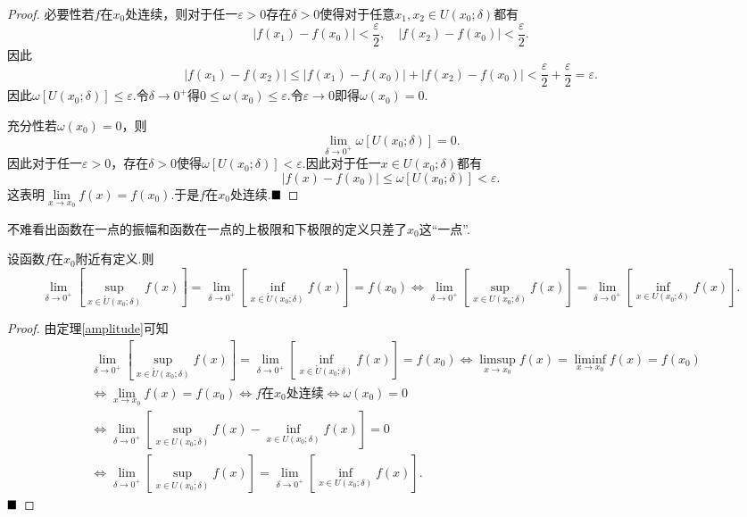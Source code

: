 \begin{proof}
	必要性\qquad 若$f$在$x_0$处连续，则对于任一$\varepsilon>0$存在$\delta>0$使得对于任意$x_1,x_2\in U(x_0;\delta)$都有
	$$|f(x_1)-f(x_0)|<\frac{\varepsilon}{2},\quad |f(x_2)-f(x_0)|<\frac{\varepsilon}{2}.$$
	因此
	$$|f(x_1)-f(x_2)|\leqslant|f(x_1)-f(x_0)|+|f(x_2)-f(x_0)|<\frac{\varepsilon}{2}+\frac{\varepsilon}{2}=\varepsilon.$$
	因此$\omega\left[U(x_0;\delta)\right]\leqslant\varepsilon$.令$\delta\to 0^+$得$0\leqslant\omega(x_0)\leqslant\varepsilon$.令$\varepsilon\to 0$即得$\omega(x_0)=0$.
	
	充分性\qquad 若$\omega(x_0)=0$，则
	$$\lim\limits_{\delta\to 0^+}\omega\left[U(x_0;\delta)\right]=0.$$
	因此对于任一$\varepsilon>0$，存在$\delta>0$使得$\omega\left[U(x_0;\delta)\right]<\varepsilon$.因此对于任一$x\in U(x_0;\delta)$都有
	$$|f(x)-f(x_0)|\leqslant\omega\left[U(x_0;\delta)\right]<\varepsilon.$$
	这表明$\lim\limits_{x\to x_0}f(x)=f(x_0)$.于是$f$在$x_0$处连续.$\hfill\blacksquare$
\end{proof}
不难看出函数在一点的振幅和函数在一点的上极限和下极限的定义只差了$x_0$这“一点”.
\begin{theorem}
	设函数$f$在$x_0$附近有定义.则
	$$\lim\limits_{\delta\to 0^+}\left[\sup\limits_{x\in\mathring{U}(x_0;\delta)}f(x)\right]=\lim\limits_{\delta\to 0^+}\left[\inf\limits_{x\in\mathring{U}(x_0;\delta)}f(x)\right]=f(x_0)\iff \lim\limits_{\delta\to 0^+}\left[\sup\limits_{x\in U(x_0;\delta)}f(x)\right]=\lim\limits_{\delta\to 0^+}\left[\inf\limits_{x\in U(x_0;\delta)}f(x)\right].$$
\end{theorem}
\begin{proof}
	由定理\ref{amplitude}可知
	\begin{align*}
		&\lim\limits_{\delta\to 0^+}\left[\sup\limits_{x\in\mathring{U}(x_0;\delta)}f(x)\right]=\lim\limits_{\delta\to 0^+}\left[\inf\limits_{x\in\mathring{U}(x_0;\delta)}f(x)\right]=f(x_0)\iff\limsup\limits_{x\to x_0}f(x)=\liminf\limits_{x\to x_0}f(x)=f(x_0)\\
		&\iff\lim\limits_{x\to x_0}f(x)=f(x_0)\iff f\text{在}x_0\text{处连续}\iff\omega(x_0)=0\\
		&\iff\lim\limits_{\delta\to 0^+}\left[\sup\limits_{x\in U(x_0;\delta)}f(x)-\inf\limits_{x\in U(x_0;\delta)}f(x)\right]=0\\
		&\iff\lim\limits_{\delta\to 0^+}\left[\sup\limits_{x\in U(x_0;\delta)}f(x)\right]=\lim\limits_{\delta\to 0^+}\left[\inf\limits_{x\in U(x_0;\delta)}f(x)\right].
	\end{align*}
	$\hfill\blacksquare$
\end{proof}
